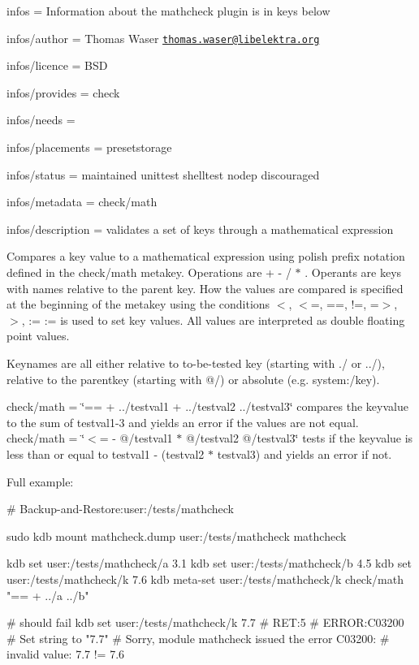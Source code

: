 
\begin{DoxyItemize}
\item infos = Information about the mathcheck plugin is in keys below
\item infos/author = Thomas Waser \href{mailto:thomas.waser@libelektra.org}{\tt thomas.\+waser@libelektra.\+org}
\item infos/licence = B\+SD
\item infos/provides = check
\item infos/needs =
\item infos/placements = presetstorage
\item infos/status = maintained unittest shelltest nodep discouraged
\item infos/metadata = check/math
\item infos/description = validates a set of keys through a mathematical expression
\end{DoxyItemize}

Compares a key value to a mathematical expression using polish prefix notation defined in the {\ttfamily check/math} metakey. Operations are {\ttfamily + -\/ / $\ast$} . Operants are keys with names relative to the parent key. How the values are compared is specified at the beginning of the metakey using the conditions {\ttfamily $<$, $<$=, ==, !=, =$>$, $>$, \+:=} {\ttfamily \+:=} is used to set key values. All values are interpreted as {\ttfamily double} floating point values.

Keynames are all either relative to to-\/be-\/tested key (starting with {\ttfamily ./} or {\ttfamily ../}), relative to the parentkey (starting with {\ttfamily @/}) or absolute (e.\+g. {\ttfamily system\+:/key}).

{\ttfamily check/math = \char`\"{}== + ../testval1 + ../testval2 ../testval3\char`\"{}} compares the keyvalue to the sum of testval1-\/3 and yields an error if the values are not equal. {\ttfamily check/math = \char`\"{}$<$= -\/ @/testval1 $\ast$ @/testval2 @/testval3\char`\"{}} tests if the keyvalue is less than or equal to {\ttfamily testval1 -\/ (testval2 $\ast$ testval3)} and yields an error if not.

Full example\+:


\begin{DoxyCode}
# Backup-and-Restore:user:/tests/mathcheck

sudo kdb mount mathcheck.dump user:/tests/mathcheck mathcheck

kdb set user:/tests/mathcheck/a 3.1
kdb set user:/tests/mathcheck/b 4.5
kdb set user:/tests/mathcheck/k 7.6
kdb meta-set user:/tests/mathcheck/k check/math "== + ../a ../b"

# should fail
kdb set user:/tests/mathcheck/k 7.7
# RET:5
# ERROR:C03200
# Set string to "7.7"
# Sorry, module mathcheck issued the error C03200:
# invalid value: 7.7 != 7.6
\end{DoxyCode}


